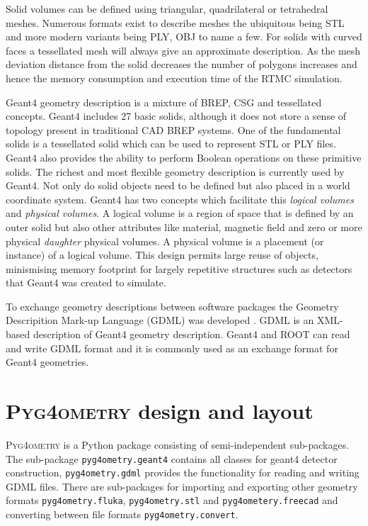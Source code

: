 \documentclass[final,5p,times,twocolumn]{elsarticle}
\newcommand{\pyinline}[1]{\lstinline[postbreak={}]{#1}}
\newcommand{\PYGEOMETRY}{\textsc{Pyg4ometry}}
\begin{document}
Solid volumes can be defined using triangular, quadrilateral or tetrahedral meshes. Numerous formats exist to describe meshes the ubiquitous being STL and 
more modern variants being PLY, OBJ to name a few. For solids with curved faces a tessellated mesh will always give an approximate description. As the mesh 
deviation distance from the solid decreases the number of polygons increases and hence the memory consumption and execution time of the RTMC simulation. 

Geant4 geometry description is a mixture of BREP, CSG and tessellated concepts. Geant4 includes 27 basic solids, although it does not store a sense 
of topology present in traditional CAD BREP systems. One of the fundamental solids is a tessellated solid which can be used to represent STL or PLY files. 
Geant4 also provides the ability to perform Boolean operations on these primitive solids. The richest and most flexible geometry description is currently used by
Geant4. Not only do solid objects need to be defined but also placed in a world coordinate system. Geant4 has two concepts which facilitate this {\em logical volumes} and {\em physical volumes}. A logical volume is a region of space that is defined by an outer solid but also other attributes like material, magnetic field 
and zero or more physical {\em daughter} physical volumes. A physical volume is a placement (or instance) of a logical volume. This design permits large reuse of objects, minismising memory footprint for largely repetitive structures such as detectors that Geant4 was created to simulate.  


To exchange geometry descriptions between software packages the Geometry Descripition Mark-up Language (GDML) was developed \cite{GDML}. 
GDML is an XML-based description of Geant4 geometry description. Geant4 and ROOT \cite{fons_rademakers_2019_3895860} can read and write 
GDML format and it is commonly used as an exchange format for Geant4 geometries. 

\section{\PYGEOMETRY{} design and layout}
\PYGEOMETRY{} is a Python package consisting of semi-independent sub-packages. The sub-package \pyinline{pyg4ometry.geant4} contains all classes for 
geant4 detector construction, \pyinline{pyg4ometry.gdml} provides the functionality for reading and writing GDML files. There are sub-packages for importing and exporting other geometry formats  \pyinline{pyg4ometry.fluka}, \pyinline{pyg4ometry.stl} and \pyinline{pyg4ometery.freecad} and converting between file formats \verb|pyg4ometry.convert|.
\end{document}
